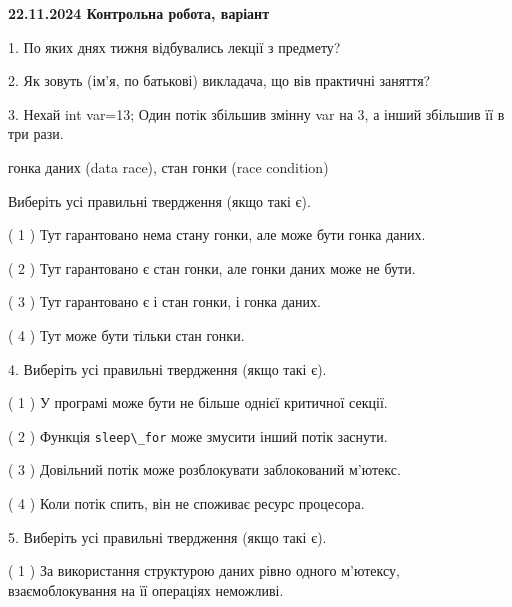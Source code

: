 \documentclass[12pt, ukrainian]{article}
\def\code#1{\Verb!#1!}
\begin{document}
\vspace{4mm}
\newpage
\begin {large}

\textbf{22.11.2024 Контрольна робота, варіант  }\par


{
1. По яких днях тижня відбувались лекції з предмету?



\vspace{5mm}
2. Як зовуть (ім'я, по батькові) викладача, що вів практичні заняття?



\vspace{5mm}
3. Нехай int var=13; Один потік збільшив змінну var на 3, а інший збільшив її в три рази.

гонка даних (data race), стан гонки (race condition)

Виберіть усі правильні твердження (якщо такі є).\par
\vspace{2mm}
( 1 ) Тут гарантовано нема стану гонки, але може бути гонка даних.%

( 2 ) Тут гарантовано є стан гонки, але гонки даних може не бути.%

( 3 ) Тут гарантовано є і стан гонки, і гонка даних.%

( 4 ) Тут може бути тільки стан гонки.%


\vspace{5mm}
4. Виберіть усі правильні твердження (якщо такі є).\par
\vspace{2mm}

( 1 ) У програмі може бути не більше однієї критичної секції.%

( 2 ) Функція \code{sleep\_for} може змусити інший потік заснути.%

( 3 ) Довільний потік може розблокувати заблокований м’ютекс.%

( 4 ) Коли потік спить, він не споживає ресурс процесора.%


\vspace{5mm}
5. Виберіть усі правильні твердження (якщо такі є).\par
\vspace{2mm}

( 1 ) За використання структурою даних рівно одного м’ютексу, взаємоблокування на її операціях неможливі.%

}
\end{large}
\end{document}
